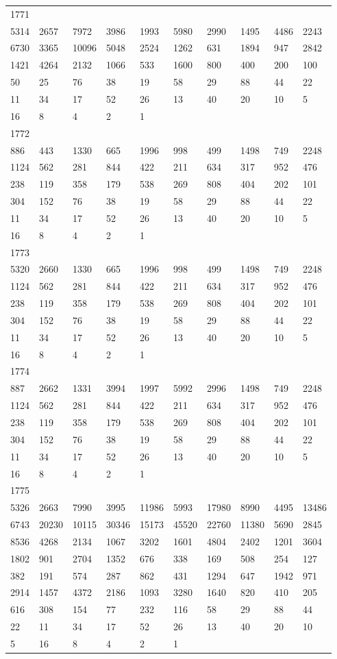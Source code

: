 \begin{longtable}{*{10}{l}}
1771&&&&&&&&&\\
5314& 2657& 7972& 3986& 1993& 5980& 2990& 1495& 4486& 2243\\
6730& 3365& 10096& 5048& 2524& 1262& 631& 1894& 947& 2842\\
1421& 4264& 2132& 1066& 533& 1600& 800& 400& 200& 100\\
50& 25& 76& 38& 19& 58& 29& 88& 44& 22\\
11& 34& 17& 52& 26& 13& 40& 20& 10& 5\\
16& 8& 4& 2& 1& \\

1772&&&&&&&&&\\
886& 443& 1330& 665& 1996& 998& 499& 1498& 749& 2248\\
1124& 562& 281& 844& 422& 211& 634& 317& 952& 476\\
238& 119& 358& 179& 538& 269& 808& 404& 202& 101\\
304& 152& 76& 38& 19& 58& 29& 88& 44& 22\\
11& 34& 17& 52& 26& 13& 40& 20& 10& 5\\
16& 8& 4& 2& 1& \\

1773&&&&&&&&&\\
5320& 2660& 1330& 665& 1996& 998& 499& 1498& 749& 2248\\
1124& 562& 281& 844& 422& 211& 634& 317& 952& 476\\
238& 119& 358& 179& 538& 269& 808& 404& 202& 101\\
304& 152& 76& 38& 19& 58& 29& 88& 44& 22\\
11& 34& 17& 52& 26& 13& 40& 20& 10& 5\\
16& 8& 4& 2& 1& \\

1774&&&&&&&&&\\
887& 2662& 1331& 3994& 1997& 5992& 2996& 1498& 749& 2248\\
1124& 562& 281& 844& 422& 211& 634& 317& 952& 476\\
238& 119& 358& 179& 538& 269& 808& 404& 202& 101\\
304& 152& 76& 38& 19& 58& 29& 88& 44& 22\\
11& 34& 17& 52& 26& 13& 40& 20& 10& 5\\
16& 8& 4& 2& 1& \\

1775&&&&&&&&&\\
5326& 2663& 7990& 3995& 11986& 5993& 17980& 8990& 4495& 13486\\
6743& 20230& 10115& 30346& 15173& 45520& 22760& 11380& 5690& 2845\\
8536& 4268& 2134& 1067& 3202& 1601& 4804& 2402& 1201& 3604\\
1802& 901& 2704& 1352& 676& 338& 169& 508& 254& 127\\
382& 191& 574& 287& 862& 431& 1294& 647& 1942& 971\\
2914& 1457& 4372& 2186& 1093& 3280& 1640& 820& 410& 205\\
616& 308& 154& 77& 232& 116& 58& 29& 88& 44\\
22& 11& 34& 17& 52& 26& 13& 40& 20& 10\\
5& 16& 8& 4& 2& 1& \\


\end{longtable}

